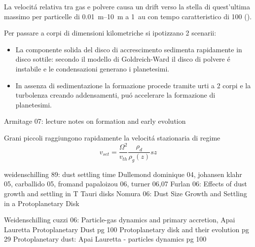 \begin{workout}
	La velocit\'a relativa tra gas e polvere causa un drift verso la stella di quest'ultima massimo per particelle di \SIrange{0.01}{10}{\meter}  a \SI{1}{\astronomicalunit} con tempo caratteristico di \SI{100}{\year} (\cite{lissauer1993planet}).
	
	Per passare a corpi di dimensioni kilometriche si ipotizzano 2 scenarii:
	\begin{itemize}
		\item La componente solida del disco di accrescimento sedimenta rapidamente in disco sottile: secondo il modello di Goldreich-Ward il disco di polvere \'e instabile e le condensazioni generano i planetesimi.
		\item In assenza di sedimentazione la formazione procede tramite urti a 2 corpi e la turbolenza creando addensamenti, pu\'o accelerare la formazione di planetesimi.
	\end{itemize}
\end{workout}

\begin{workout}
	Armitage 07: lecture notes on formation and early evolution
\end{workout}

\begin{workout}	
	Grani piccoli raggiungono rapidamente la velocit\'a stazionaria di regime
	\begin{equation}
	v_{set}=\frac{\Omega^2}{v_{th}}\frac{\rho_d}{\rho_g(z)}sz
	\end{equation}
\end{workout}

\begin{workout}
	weidenschilling 89: dust settling time
	Dullemond dominique 04, johansen klahr 05, carballido 05, fromand papaloizou 06, turner 06,07
	Furlan 06: Effects of dust growth and settling in T Tauri disks
	Nomura 06: Dust Size Growth and Settling in a Protoplanetary Disk
	\cite{lissauer1993planet}
\end{workout}

\begin{workout}
	Weidenschilling cuzzi 06: Particle-gas dynamics and primary accretion, Apai Lauretta Protoplanetary Dust pg 100
	Protoplanetary disk and their evolution pg 29
	Protoplanetary dust: Apai Lauretta - particles dynamics pg 100
\end{workout}

